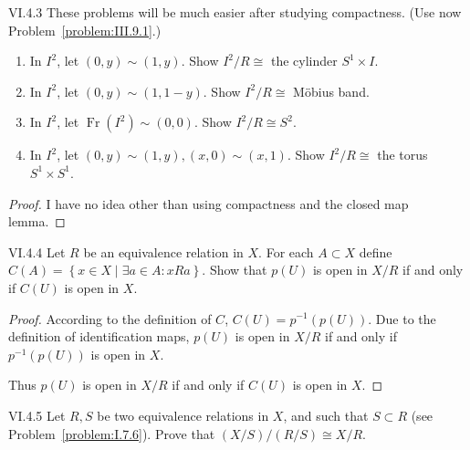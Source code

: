\begin{problem}{VI.4.3}
These problems will be much easier after studying compactness. (Use now Problem~\ref{problem:III.9.1}.)
\begin{enumerate}[label={(\alph*)}]
	\item In \( I^{2} \), let \( (0, y) \sim (1, y) \). Show \( I^{2}/R \cong \) the cylinder \( S^{1} \times I \).
	\item In \( I^{2} \), let \( (0, y) \sim (1, 1 - y) \). Show \( I^{2}/R \cong \) M\"{o}bius band.
	\item In \( I^{2} \), let \( \operatorname{Fr}(I^{2}) \sim (0, 0) \). Show \( I^{2}/R \cong S^{2} \).
	\item In \( I^{2} \), let \( (0, y) \sim (1, y), (x, 0) \sim (x, 1) \). Show \( I^{2}/R \cong \) the torus \( S^{1} \times S^{1} \).
\end{enumerate}
\end{problem}

\begin{proof}
	I have no idea other than using compactness and the closed map lemma.
\end{proof}

\begin{problem}{VI.4.4}
Let \( R \) be an equivalence relation in \( X \). For each \( A \subset X \) define \( C(A) = \left\{ x \in X \mid \exists a \in A: x R a \right\} \). Show that \( p(U) \) is open in \( X/R \) if and only if \( C(U) \) is open in \( X \).
\end{problem}

\begin{proof}
	According to the definition of \( C \), \( C(U) = p^{-1}(p(U)) \). Due to the definition of identification maps, \( p(U) \) is open in \( X/R \) if and only if \( p^{-1}(p(U)) \) is open in \( X \).

	Thus \( p(U) \) is open in \( X/R \) if and only if \( C(U) \) is open in \( X \).
\end{proof}

\begin{problem}{VI.4.5}
Let \( R, S \) be two equivalence relations in \( X \), and such that \( S \subset R \) (see Problem~\ref{problem:I.7.6}). Prove that \( (X/S)/(R/S) \cong X/R \).
\end{problem}

